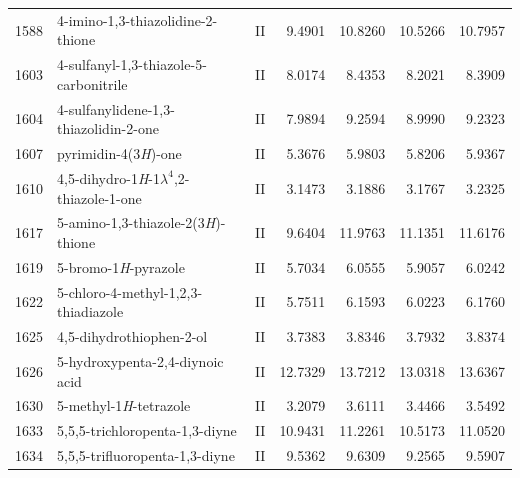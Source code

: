 \begin{longtable}{rlld{2.5}d{2.5}d{2.5}d{2.5}}
    1588 & 4-imino-1,3-thiazolidine-2-thione                      & II & 9.4901  & 10.8260 & 10.5266 & 10.7957 \\
    1603 & 4-sulfanyl-1,3-thiazole-5-carbonitrile                 & II & 8.0174  & 8.4353  & 8.2021  & 8.3909  \\
    1604 & 4-sulfanylidene-1,3-thiazolidin-2-one                  & II & 7.9894  & 9.2594  & 8.9990  & 9.2323  \\
    1607 & pyrimidin-4(3\textit{H})-one                           & II & 5.3676  & 5.9803  & 5.8206  & 5.9367  \\
    1610 & 4,5-dihydro-1\textit{H}-1$\lambda^4$,2-thiazole-1-one  & II & 3.1473  & 3.1886  & 3.1767  & 3.2325  \\
    1617 & 5-amino-1,3-thiazole-2(3\textit{H})-thione             & II & 9.6404  & 11.9763 & 11.1351 & 11.6176 \\
    1619 & 5-bromo-1\textit{H}-pyrazole                           & II & 5.7034  & 6.0555  & 5.9057  & 6.0242  \\
    1622 & 5-chloro-4-methyl-1,2,3-thiadiazole                    & II & 5.7511  & 6.1593  & 6.0223  & 6.1760  \\
    1625 & 4,5-dihydrothiophen-2-ol                               & II & 3.7383  & 3.8346  & 3.7932  & 3.8374  \\
    1626 & 5-hydroxypenta-2,4-diynoic   acid                      & II & 12.7329 & 13.7212 & 13.0318 & 13.6367 \\
    1630 & 5-methyl-1\textit{H}-tetrazole                         & II & 3.2079  & 3.6111  & 3.4466  & 3.5492  \\
    1633 & 5,5,5-trichloropenta-1,3-diyne                         & II & 10.9431 & 11.2261 & 10.5173 & 11.0520 \\
    1634 & 5,5,5-trifluoropenta-1,3-diyne                         & II & 9.5362  & 9.6309  & 9.2565  & 9.5907 
\end{longtable}

\newpage




